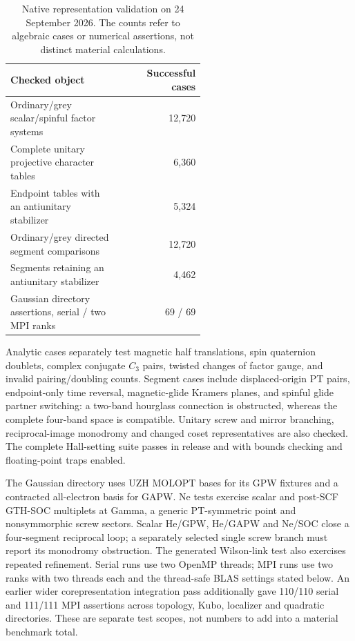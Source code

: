 \documentclass[11pt]{article}
\begin{document}
\begin{table}[htbp]
\centering\small
\begin{tabular}{p{0.56\linewidth}r}
\toprule
Checked object & Successful cases\\
\midrule
Ordinary/grey scalar/spinful factor systems & 12,720\\
Complete unitary projective character tables & 6,360\\
Endpoint tables with an antiunitary stabilizer & 5,324\\
Ordinary/grey directed segment comparisons & 12,720\\
Segments retaining an antiunitary stabilizer & 4,462\\
Gaussian directory assertions, serial / two MPI ranks & 69 / 69\\
\bottomrule
\end{tabular}
\caption{Native representation validation on 24 September 2026.
The counts refer to algebraic cases or numerical assertions, not
distinct material calculations.}
\end{table}

Analytic cases separately test magnetic half translations, spin
quaternion doublets, complex conjugate $C_3$ pairs, twisted changes
of factor gauge, and invalid pairing/doubling counts. Segment cases
include displaced-origin PT pairs, endpoint-only time reversal,
magnetic-glide Kramers planes, and spinful glide partner switching:
a two-band hourglass connection is obstructed, whereas the complete
four-band space is compatible. Unitary screw and mirror branching,
reciprocal-image monodromy and changed coset representatives are also
checked. The complete Hall-setting suite passes in release and with
bounds checking and floating-point traps enabled.

The Gaussian directory uses UZH MOLOPT bases for its GPW fixtures and
a contracted all-electron basis for GAPW. Ne tests exercise scalar
and post-SCF GTH-SOC multiplets at Gamma, a generic PT-symmetric
point and nonsymmorphic screw sectors. Scalar He/GPW, He/GAPW and
Ne/SOC close a four-segment reciprocal loop; a separately selected
single screw branch must report its monodromy obstruction.
The generated Wilson-link test also exercises repeated refinement.
Serial runs use two OpenMP threads; MPI runs use two ranks with two
threads each and the thread-safe BLAS settings stated below.
An earlier wider corepresentation integration pass additionally gave
110/110 serial and 111/111 MPI assertions across topology, Kubo,
localizer and quadratic directories. These are separate test scopes,
not numbers to add into a material benchmark total.
\end{document}
